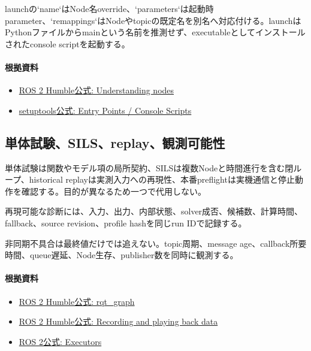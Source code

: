 \documentclass[a4paper,11pt]{article}
\begin{document}
launchの`name`はNode名override、`parameters`は起動時parameter、`remappings`はNodeやtopicの既定名を別名へ対応付ける。launchはPythonファイルからmainという名前を推測せず、executableとしてインストールされたconsole scriptを起動する。

\paragraph{根拠資料}
\begin{itemize}[leftmargin=1.6em]
\item \href{https://docs.ros.org/en/humble/Tutorials/Beginner-CLI-Tools/Understanding-ROS2-Nodes/Understanding-ROS2-Nodes.html}{ROS 2 Humble公式: Understanding nodes}
\item \href{https://setuptools.pypa.io/en/latest/userguide/entry_point.html}{setuptools公式: Entry Points / Console Scripts}
\end{itemize}

\subsection{単体試験、SILS、replay、観測可能性}
単体試験は関数やモデル項の局所契約、SILSは複数Nodeと時間進行を含む閉ループ、historical replayは実測入力への再現性、本番preflightは実機通信と停止動作を確認する。目的が異なるため一つで代用しない。


再現可能な診断には、入力、出力、内部状態、solver成否、候補数、計算時間、fallback、source revision、profile hashを同じrun IDで記録する。


非同期不具合は最終値だけでは追えない。topic周期、message age、callback所要時間、queue遅延、Node生存、publisher数を同時に観測する。

\paragraph{根拠資料}
\begin{itemize}[leftmargin=1.6em]
\item \href{https://docs.ros.org/en/ros2_packages/humble/api/rqt_graph/index.html}{ROS 2 Humble公式: rqt\_graph}
\item \href{https://docs.ros.org/en/humble/Tutorials/Beginner-CLI-Tools/Recording-And-Playing-Back-Data/Recording-And-Playing-Back-Data.html}{ROS 2 Humble公式: Recording and playing back data}
\item \href{https://docs.ros.org/en/rolling/Concepts/Intermediate/About-Executors.html}{ROS 2公式: Executors}
\end{itemize}
\end{document}
